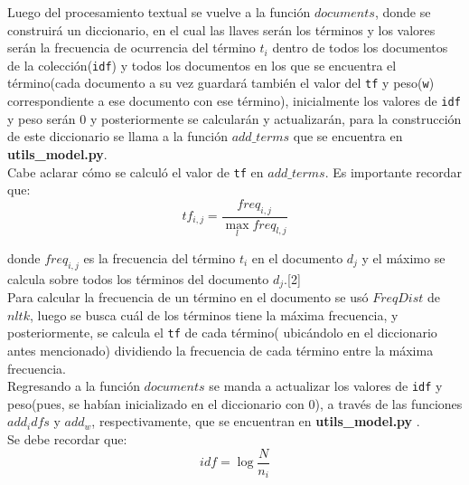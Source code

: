 \documentclass{llncs}
\begin{document}
Luego del procesamiento textual se vuelve a la funci\'on $documents$, donde se construir\'a un diccionario, en el cual las llaves ser\'an los t\'erminos y los valores ser\'an la frecuencia de ocurrencia del t\'ermino \texttt{$t_i$} dentro de todos los documentos de la colecci\'on(\texttt{idf}) y todos los documentos en los que se encuentra el t\'ermino(cada documento a su vez guardar\'a tambi\'en el valor del \texttt{tf} y peso(\texttt{w}) correspondiente a ese documento con ese t\'ermino), inicialmente los valores de \texttt{idf} y peso ser\'an 0 y posteriormente se calcular\'an y actualizar\'an, para la construcci\'on de este diccionario se llama a la funci\'on $add\_terms$ que se encuentra en \textbf{utils\_model.py}.\\

Cabe aclarar c\'omo se calcul\'o el valor de \texttt{tf} en $add\_terms$. Es importante recordar que:\\

\begin{equation}
	tf_{i,j} = \frac{freq_{i,j}}{\max_l freq_{l,j}}
\end{equation}

donde \texttt{$freq_{i,j}$} es la frecuencia del t\'ermino \texttt{$t_i$} en el documento \texttt{$d_j$} y el m\'aximo se calcula sobre todos los t\'erminos del documento \texttt{$d_j$}.[2]\\


Para calcular la frecuencia de un t\'ermino en el documento se us\'o $FreqDist$ de $nltk$, luego se busca cu\'al de los t\'erminos tiene la m\'axima frecuencia, y posteriormente, se calcula el \texttt{tf} de cada t\'ermino( ubic\'andolo en el diccionario antes mencionado) dividiendo la frecuencia de cada t\'ermino entre la m\'axima frecuencia.\\

Regresando a la funci\'on $documents$ se manda a actualizar los valores de \texttt{idf} y peso(pues, se hab\'ian inicializado en el diccionario con 0), a trav\'es de las funciones $add_idfs$ y $add_w$, respectivamente, que se encuentran en \textbf{utils\_model.py} .\\
                                                                                                                                                                                              
Se debe recordar que:\\

\begin{equation}
	idf = \log \frac{N}{n_i}
\end{equation}  
\end{document}
